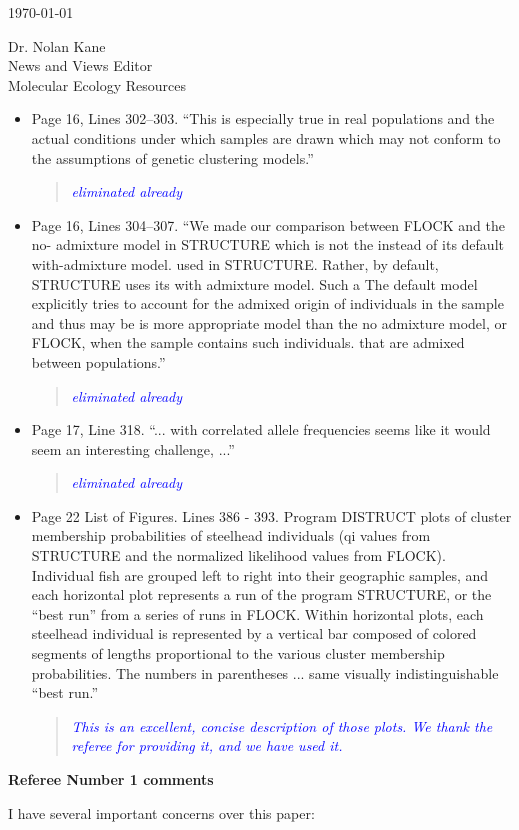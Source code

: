 \documentclass[11pt]{letter}
\newcommand{\reply}[1]{\begin{quotation}\small\sl\textcolor{blue}{#1}\end{quotation}}
\begin{document}
\begin{letter}{ \today 

Dr. Nolan Kane\\
News and Views Editor\\
Molecular Ecology Resources \\
}
\begin{itemize}
\item Page 16, Lines 302--303. ``This is especially true in real populations and the actual conditions under which samples are drawn which may not conform to the assumptions of genetic clustering models.''
\reply{eliminated already}
\item Page 16, Lines 304--307. ``We made our comparison between FLOCK and the no- admixture model in STRUCTURE which is not the instead of its default with-admixture model. used in STRUCTURE. Rather, by default, STRUCTURE uses its with admixture model. Such a The default model explicitly tries to account for the admixed origin of individuals in the sample and thus may be is more appropriate model than the no admixture model, or FLOCK, when the sample contains such individuals. that are admixed between populations.''
\reply{eliminated already}
\item Page 17, Line 318. ``... with correlated allele frequencies seems like it would seem an interesting challenge, ...''
\reply{eliminated already}
\item Page 22 List of Figures. Lines 386 - 393. Program DISTRUCT plots of cluster membership probabilities of steelhead individuals (qi values from STRUCTURE and the normalized likelihood values from FLOCK). Individual fish are grouped left to right into their geographic samples, and each horizontal plot represents a run of the program
STRUCTURE, or the ``best run'' from a series of runs in FLOCK. Within horizontal plots, each steelhead individual is represented by a vertical bar composed of colored segments of lengths proportional to the various cluster membership probabilities. The numbers in parentheses ... same visually indistinguishable ``best run.''
\reply{This is an excellent, concise description of those plots. We thank the referee for 
providing it, and we have used it.}
\end{itemize}


{\bf Referee Number 1 comments}

I have several important concerns over this paper:


\end{letter}
\end{document}
